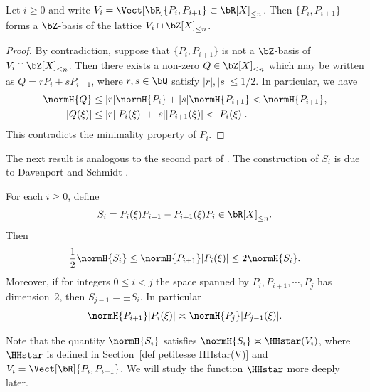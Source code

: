 \begin{Lem}
\label{Lem: P_i, P_i+1 est une Z-base}
Let $i\geq 0$ and write $V_i = \Vect[\bR]{P_i,P_{i+1}} \subset \bR[X]_{\leq n}$. Then $\{P_i, P_{i+1}\}$ forms a $\bZ$-basis of the lattice $V_i\cap \bZ[X]_{\leq n}$.
\end{Lem}

\begin{proof}
By contradiction, suppose that $\{P_i, P_{i+1}\}$ is not a $\bZ$-basis of $V_i\cap \bZ[X]_{\leq n}$. Then there exists a non-zero $Q\in \bZ[X]_{\leq n}$ which may be written as $Q = rP_i + sP_{i+1}$, where $r,s\in\bQ$ satisfy $|r|,|s|\leq 1/2$. In particular, we have
\begin{align*}
\normH{Q} &\leq |r|\normH{P_i} + |s|\normH{P_{i+1}} < \normH{P_{i+1}}, \\
|Q(\xi)| &\leq |r||P_i(\xi)| + |s||P_{i+1}(\xi)| < |P_{i}(\xi)|.
\end{align*}
This contradicts the minimality property of $P_i$.
\end{proof}

The next result is analogous to the second part of \cite[Lem.\,4.1]{roy2004approximation}. The construction of $S_i$ is due to Davenport and Schmidt \cite{davenport1967approximation}.

\begin{Lem}
\label{Lem: P_iH_i+1 = P_j-1H_j}
For each $i\geq 0$, define
\[
S_i = P_i(\xi)P_{i+1} - P_{i+1}(\xi)P_i \in\bR[X]_{\leq n}.
\]
Then
\[
\frac{1}{2}\normH{S_i} \leq \normH{P_{i+1}}|P_i(\xi)| \leq 2\normH{S_i}.
\]
Moreover, if for integers $0\leq i < j$ the space spanned by $P_i, P_{i+1}, \cdots, P_{j}$ has dimension~$2$, then $S_{j-1} = \pm S_i$. In particular
\[
\normH{P_{i+1}}|P_i(\xi)| \asymp \normH{P_{j}}|P_{j-1}(\xi)|.
\]
\end{Lem}

\begin{Rem}
Note that the quantity $\normH{S_i}$ satisfies $\normH{S_i} \asymp \HHstar(V_i)$, where $\HHstar$ is defined in Section~\ref{def petitesse HHstar(V)} and $V_i=\Vect[\bR]{P_i,P_{i+1}}$. We will study the function $\HHstar$ more deeply later.
\end{Rem}

